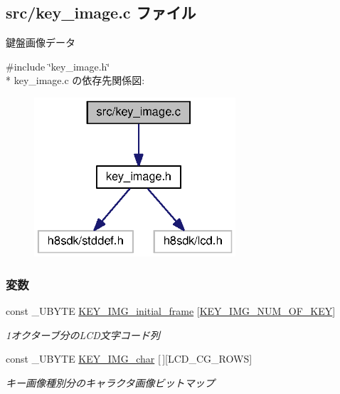 \subsection{src/key\+\_\+image.c ファイル}
\label{key__image_8c}


鍵盤画像データ  


{\ttfamily \#include \char`\"{}key\+\_\+image.\+h\char`\"{}}\\*
key\+\_\+image.\+c の依存先関係図\+:
\nopagebreak
\begin{figure}[H]
\begin{center}
\leavevmode
\includegraphics[width=212pt]{df/d59/key__image_8c__incl}
\end{center}
\end{figure}
\subsubsection*{変数}
\begin{DoxyCompactItemize}
\item 
const \+\_\+\+U\+B\+Y\+T\+E \hyperlink{key__image_8c_aac267b2e32d4518bd2661895e8667365_aac267b2e32d4518bd2661895e8667365}{K\+E\+Y\+\_\+\+I\+M\+G\+\_\+initial\+\_\+frame} \mbox{[}\hyperlink{key__image_8h_a6e24b4d8bd16a740050b1d5acfd8a6f1_a6e24b4d8bd16a740050b1d5acfd8a6f1}{K\+E\+Y\+\_\+\+I\+M\+G\+\_\+\+N\+U\+M\+\_\+\+O\+F\+\_\+\+K\+E\+Y}\mbox{]}
\begin{DoxyCompactList}\small\item\em 1オクターブ分の\+L\+C\+D文字コード列 \end{DoxyCompactList}\item 
const \+\_\+\+U\+B\+Y\+T\+E \hyperlink{key__image_8c_a232f4f540a0f671fb2f980064795d03b_a232f4f540a0f671fb2f980064795d03b}{K\+E\+Y\+\_\+\+I\+M\+G\+\_\+char} \mbox{[}$\,$\mbox{]}\mbox{[}L\+C\+D\+\_\+\+C\+G\+\_\+\+R\+O\+W\+S\mbox{]}
\begin{DoxyCompactList}\small\item\em キー画像種別分のキャラクタ画像ビットマップ \end{DoxyCompactList}\end{DoxyCompactItemize}


